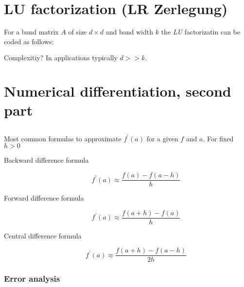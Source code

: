 \chapter{LU factorization (LR Zerlegung)}

For a band matrix $A$ of size $d \times d$ and band width $k$ the \textit{LU}
factorizatin can be coded as follows:


Complexitiy? In applications typically $d >> k$.

\chapter{Numerical differentiation, second part}

\section{}
Most common formulas to approximate $f^{'}(a)$ for a given $f$ and 
$a$. For fixed $h > 0$

\begin{description}
	\item[Backward difference formula]
		\[f^{'}(a) \approx \frac{f(a) - f(a-h)}{h}\]
	\item[Forward difference formula]
		\[f^{'}(a) \approx \frac{f(a + h) - f(a)}{h}\]
	\item[Central difference formula]
		\[f^{'}(a) \approx \frac{f(a + h) - f(a - h)}{2h}\]
\end{description}

\subsection{Error analysis}

